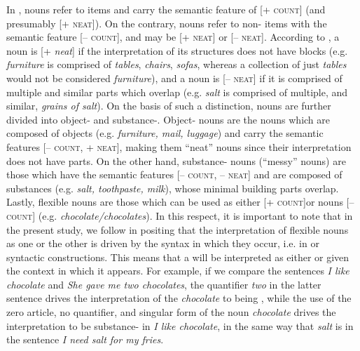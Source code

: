 \documentclass[output=paper]{langsci/langscibook}
\begin{document}
In ,  nouns refer to  items and carry the semantic feature of [\textsc{+ count}] (and presumably [\textsc{+ neat}]). On the contrary,  nouns refer to non- items with the semantic feature [– \textsc{count}], and may be [+ \textsc{neat}] or [– \textsc{neat}]. According to \citet{Landman2011}, a noun is [+ \textit{neat}] if the interpretation of its structures does not have  blocks (e.g. \textit{furniture} is comprised of \textit{tables}, \textit{chairs}, \textit{sofas}, whereas a collection of just \textit{tables} would not be considered \textit{furniture}), and a noun is [– \textsc{neat}] if it is comprised of multiple and similar parts which overlap (e.g. \textit{salt} is comprised of multiple, and similar, \textit{grains of salt}). On the basis of such a distinction,  nouns are further divided into object- and substance-. Object- nouns are the nouns which are composed of objects (e.g. \textit{furniture, mail, luggage}) and carry the semantic features [\textsc{– count, + neat}], making them “neat”  nouns since their interpretation does not have  parts. On the other hand, substance- nouns (“messy”  nouns) are those which have the semantic features [\textsc{– count, – neat}] and are composed of substances (e.g. \textit{salt, toothpaste, milk}), whose minimal building parts overlap.  Lastly, flexible nouns are those which can be used as either  [\textsc{+ count}]or  nouns [\textsc{– count}] (e.g. \textit{chocolate/chocolates}). In this respect, it is important to note that in the present study, we follow \citet{BarnerSnedeker2005} in positing that the interpretation of flexible nouns as one or the other is driven by the syntax in which they occur, i.e. in  or  syntactic constructions. This means that a  will be interpreted as either  or  given the context in which it appears. For example, if we compare the sentences \textit{I like chocolate} and \textit{She gave me two chocolates}, the quantifier \textit{two} in the latter sentence drives the interpretation of the  \textit{chocolate} to being , while the use of the zero article, no quantifier, and singular form of the noun \textit{chocolate} drives the interpretation to be substance- in \textit{I like chocolate}, in the same way that \textit{salt} is  in the sentence \textit{I need salt for my fries}.
\end{document}
